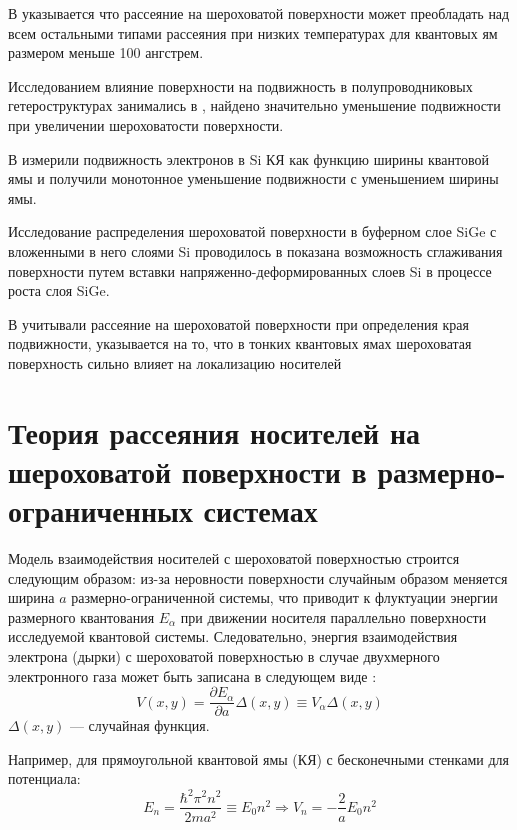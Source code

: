 В \cite{Penner1999} указывается что рассеяние на шероховатой поверхности может преобладать над всем остальными типами рассеяния при низких температурах для квантовых ям размером меньше 100 ангстрем.

Исследованием влияние поверхности на подвижность в полупроводниковых гетероструктурах занимались в \cite{Feenstra1995}, найдено значительно уменьшение подвижности при увеличении шероховатости поверхности.

В \cite{Yutani1996} измерили подвижность электронов в Si КЯ как функцию ширины квантовой ямы и получили монотонное уменьшение подвижности с уменьшением ширины ямы.

Исследование распределения шероховатой поверхности в буферном слое SiGe с вложенными в него слоями Si проводилось в \cite{Yoon2005} показана возможность сглаживания поверхности путем вставки напряженно-деформированных слоев Si в процессе роста слоя SiGe.

В \cite{Tito2017} учитывали рассеяние на шероховатой поверхности при определения края подвижности, указывается на то, что в тонких квантовых ямах шероховатая поверхность сильно влияет на локализацию носителей


\section{Теория рассеяния носителей на шероховатой поверхности в размерно-ограниченных системах} \label{sect1_2}
Модель взаимодействия носителей с шероховатой поверхностью строится следующим образом: из-за неровности поверхности случайным образом меняется ширина $a$ размерно-ограниченной системы, что приводит к флуктуации энергии размерного квантования $E_{\alpha}$ при движении носителя параллельно поверхности исследуемой квантовой системы. Следовательно, энергия взаимодействия электрона (дырки) с шероховатой поверхностью в случае двухмерного электронного газа может быть записана в следующем виде \cite{Sakaki1987}:
\begin{equation}
\label{eq:1_1}
V(x,y)=\frac{\partial E_{\alpha}}{\partial a}\Delta(x,y)\equiv V_{\alpha} \Delta(x,y)
\end{equation}
$\Delta(x,y)$ --- случайная функция.

Например, для прямоугольной квантовой ямы (КЯ) с бесконечными стенками для потенциала:
\begin{equation}
\label{eq:1_2}
E_n = \frac{\hbar^2 \pi^2 n^2}{2ma^2} \equiv E_0 n^2 \Rightarrow V_n = -\frac{2}{a}E_0 n^2
\end{equation}

